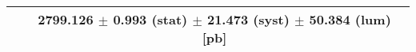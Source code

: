 \begin{tabular}{lc}
\hline
                               & 2799.126 $\pm$ 0.993 (stat) $\pm$ 21.473 (syst) $\pm$ 50.384 (lum) [pb]  \\
\hline
\end{tabular}

